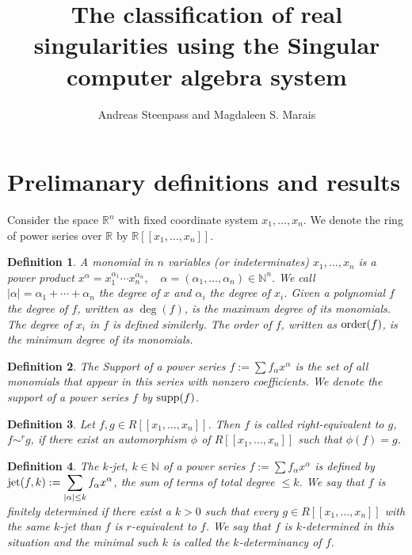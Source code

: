 \documentclass{amsproc}
\title{The classification of real singularities using the Singular computer algebra system}
\author{Andreas Steenpass and Magdaleen S. Marais}
\begin{document}
\begin{abstract}
\end{abstract}
\maketitle
\section{Prelimanary definitions and results}
Consider the space $\mathbb R^n$ with fixed coordinate system $x_1,\ldots,x_n$. We denote the ring of power series over $\mathbb R$ by $\mathbb R[[x_1,\ldots,x_n]]$.
\newtheorem{Monomial}{Definition}[section]
\begin{Monomial}\label{Monomial}
A monomial in $n$ variables (or indeterminates) $x_1,\ldots,x_n$ is a power product
$x^{\alpha}=x_1^{\alpha_1}\cdots x_n^{\alpha_n},\quad\alpha=(\alpha_1,\ldots,\alpha_n)\in\mathbb N^n.$ We call $|\alpha|=\alpha_1+\cdots+\alpha_n$ the degree of $x$ and $\alpha_i$ the degree of $x_i$. Given a polynomial $f$ the degree of $f$, written as $\deg(f)$, is the maximum degree of its monomials. The degree of $x_i$ in $f$ is defined similerly. The order of $f$, written as $\textnormal{order}(f)$, is the minimum degree of its monomials. 
\end{Monomial}
\newtheorem{Support}[Monomial]{Definition}
\begin{Support}
The Support of a power series $f:=\sum f_\alpha  x^{\alpha}$ is the set of all monomials that appear in this series with nonzero coefficients. We denote the support of a power series $f$ by $\textnormal{supp}(f)$.
\end{Support}
\newtheorem{r-equiv}[Monomial]{Definition}
\begin{r-equiv}\label{r-equiv}
Let $f,g\in R[[x_1,\ldots,x_n]]$. Then $f$ is called right-equivalent to $g$, $f \sim^rg$, if there exist an automorphism  $\phi$ of $R[[x_1,\ldots,x_n]]$ such that $\phi(f)=g$.
\end{r-equiv}
\newtheorem{jet}[Monomial]{Definition}
\begin{jet}\label{jet}
The $k$-jet, $k\in\mathbb N$ of a power series $f:=\sum f_\alpha  x^{\alpha}$ is defined by $\displaystyle\textnormal{jet}(f,k):=\sum_{|\alpha|\le k}f_{\alpha}x^{\alpha}$, the sum of terms of total degree $\le k$. We say that $f$ is finitely determined if there exist a $k>0$ such that every $g\in R[[x_1,\ldots,x_n]]$ with the same $k$-jet than $f$ is $r$-equivalent to $f$.  We say that $f$ is $k$-determined in this situation and the minimal such $k$ is called the $k$-determinancy of $f$.
\end{jet}
\end{document}
